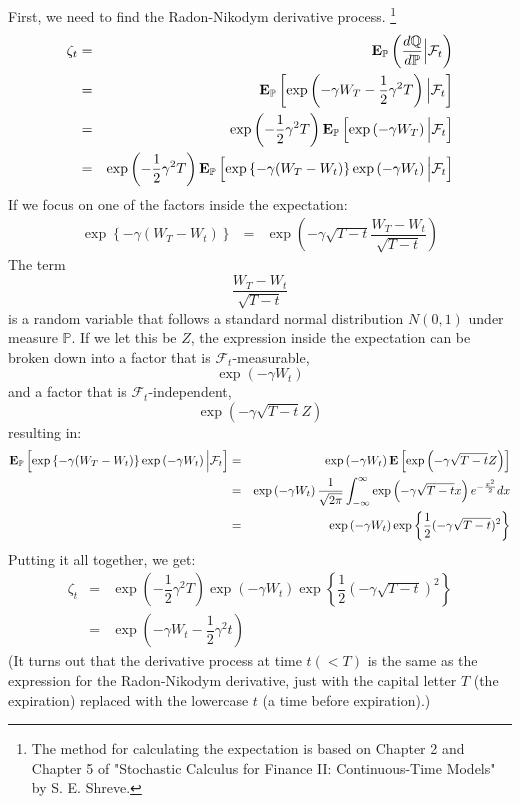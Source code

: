 \documentclass[uplatex,a4j,12pt,dvipdfmx]{jsarticle}
\begin{document}
First, we need to find the Radon-Nikodym derivative process.
\footnote{The method for calculating the expectation is based on Chapter 2 and Chapter 5 of "Stochastic Calculus for Finance II: Continuous-Time Models" by S. E. Shreve.}
%
\begin{eqnarray*}
	\zeta_{t}
	&=&
	{\bf E}_{\mathbb{P}}
	\left( \dfrac{ d \mathbb{Q} }{ d \mathbb{P} } \Big| \mathcal{F}_{t} \right)
	\\ &=&
	{\bf E}_{\mathbb{P}}
	\left[ \exp \left( - \gamma W_{T} - \dfrac{1}{2} \gamma^{2} T \right)
		\Big| \mathcal{F}_{t} \right]
	\\ &=&
	\exp \left( - \dfrac{1}{2} \gamma^{2} T \right)
	{\bf E}_{\mathbb{P}}
	\left[ \exp \left( - \gamma W_{T} \right)
		\Big| \mathcal{F}_{t} \right]
	\\ &=&
	\exp \left( - \dfrac{1}{2} \gamma^{2} T \right)
	{\bf E}_{\mathbb{P}}
	\left[
		\exp \left\{ - \gamma ( W_{T} - W_{t} ) \right\}
		\exp \left( - \gamma W_{t} \right)
		\Big| \mathcal{F}_{t} \right]
\end{eqnarray*}
%
If we focus on one of the factors inside the expectation:
%
\begin{eqnarray*}
	\exp \left\{ - \gamma ( W_{T} - W_{t} ) \right\}
	&=&
	\exp \left( - \gamma \sqrt{T - t} \dfrac{ W_{T} - W_{t} }{ \sqrt{T - t} } \right)
\end{eqnarray*}
%
The term
$$
	\dfrac{ W_{T} - W_{t} }{ \sqrt{T - t} }
$$
is a random variable that follows a standard normal distribution $N(0,1)$ under measure $\mathbb{P}$.
If we let this be $Z$, the expression inside the expectation can be broken down into a factor that is $\mathcal{F}_{t}$-measurable,
$$
	\exp \left( - \gamma W_{t} \right)
$$
and a factor that is $\mathcal{F}_{t}$-independent,
$$
	\exp \left( - \gamma \sqrt{T - t} Z \right)
$$
resulting in:
%
\begin{eqnarray*}
	{\bf E}_{\mathbb{P}}
	\left[
		\exp \left\{ - \gamma ( W_{T} - W_{t} ) \right\}
		\exp \left( - \gamma W_{t} \right)
		\Big| \mathcal{F}_{t} \right]
	&=&
	\exp \left( - \gamma W_{t} \right)
	{\bf E}
	\left[
		\exp \left( - \gamma \sqrt{T - t} Z \right)
		\right]
	\\ &=&
	\exp \left( - \gamma W_{t} \right)
	\dfrac{1}{\sqrt{2\pi}}
	\int^{\infty}_{-\infty}
	\exp \left( - \gamma \sqrt{T - t} x \right)
	e^{-\frac{x^{2}}{2}}
	dx
	\\ &=&
	\exp \left( - \gamma W_{t} \right)
	\exp \left\{ \dfrac{1}{2} (- \gamma \sqrt{T - t} )^{2} \right\}
\end{eqnarray*}
%
Putting it all together, we get:
%
\begin{eqnarray*}
	\zeta_{t}
	&=&
	\exp \left( - \dfrac{1}{2} \gamma^{2} T \right)
	\exp \left( - \gamma W_{t} \right)
	\exp \left\{ \dfrac{1}{2} (- \gamma \sqrt{T - t} )^{2} \right\}
	\\ &=&
	\exp \left( - \gamma W_{t} - \dfrac{1}{2} \gamma^{2} t \right)
\end{eqnarray*}
%
(It turns out that the derivative process at time $t(<T)$ is the same as the expression for the Radon-Nikodym derivative, just with the capital letter $T$ (the expiration) replaced with the lowercase $t$ (a time before expiration).)
${}$
\end{document}
